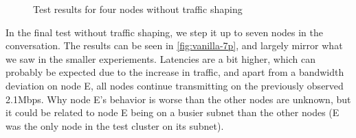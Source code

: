 \begin{figure}
\begin{subfigure}[t]{.9\textwidth}
    \end{subfigure}
    \caption{Test results for four nodes without traffic shaping}
    \label{fig:vanilla-4p}
\end{figure}

In the final test without traffic shaping, we step it up to seven nodes in the conversation. The results can be seen in \autoref{fig:vanilla-7p}, and largely mirror what we saw in the smaller experiements. Latencies are a bit higher, which can probably be expected due to the increase in traffic, and apart from a bandwidth deviation on node E, all nodes continue transmitting on the previously observed 2.1Mbps. Why node E's behavior is worse than the other nodes are unknown, but it could be related to node E being on a busier subnet than the other nodes (E was the only node in the test cluster on its subnet).


